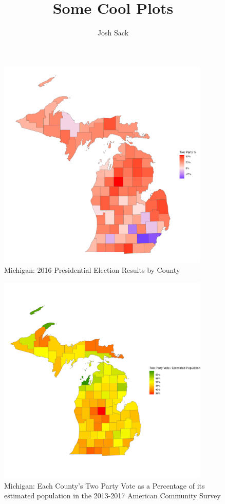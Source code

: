 \documentclass[11pt]{article}
\title{Some Cool Plots}
\author{Josh Sack}
\begin{document}
\maketitle 
\listoffigures
\begin{figure}
    \centering 
    \includegraphics[width=0.9\textwidth]{plots/county-results.png}
    \caption{Michigan: 2016 Presidential Election Results by County}
    \label{fig:2016-results}
\end{figure}
\begin{figure}
    \centering
    \includegraphics[width=0.9\textwidth]{plots/turnout.png}
    \caption{Michigan: Each County's Two Party Vote as a Percentage of its estimated population in the 2013-2017 American Community Survey}
    \label{fig:turnout}
\end{figure}
\end{document}

